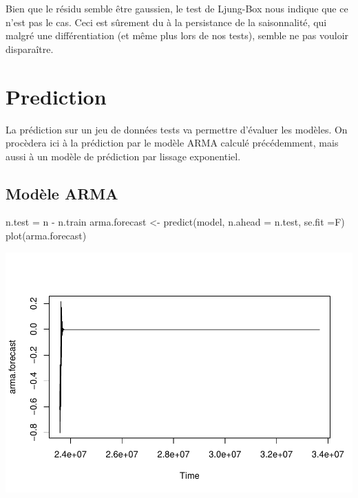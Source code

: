 \documentclass[
]{article}
\newenvironment{Shaded}{\begin{snugshade}}{\end{snugshade}}
\newcommand{\AttributeTok}[1]{\textcolor[rgb]{0.77,0.63,0.00}{#1}}
\newcommand{\FunctionTok}[1]{\textcolor[rgb]{0.00,0.00,0.00}{#1}}
\newcommand{\NormalTok}[1]{#1}
\newcommand{\OtherTok}[1]{\textcolor[rgb]{0.56,0.35,0.01}{#1}}
\newcommand{\SpecialCharTok}[1]{\textcolor[rgb]{0.00,0.00,0.00}{#1}}
\begin{document}
Bien que le résidu semble être gaussien, le test de Ljung-Box nous
indique que ce n'est pas le cas. Ceci est sûrement du à la persistance
de la saisonnalité, qui malgré une différentiation (et même plus lors de
nos tests), semble ne pas vouloir disparaître.

\hypertarget{prediction}{%
\section{Prediction}\label{prediction}}

La prédiction sur un jeu de données tests va permettre d'évaluer les
modèles. On procèdera ici à la prédiction par le modèle ARMA calculé
précédemment, mais aussi à un modèle de prédiction par lissage
exponentiel.

\hypertarget{moduxe8le-arma}{%
\subsection{Modèle ARMA}\label{moduxe8le-arma}}

\begin{Shaded}
\begin{Highlighting}[]
\NormalTok{n.test }\OtherTok{=}\NormalTok{ n }\SpecialCharTok{{-}}\NormalTok{ n.train}
\NormalTok{arma.forecast }\OtherTok{\textless{}{-}} \FunctionTok{predict}\NormalTok{(model, }\AttributeTok{n.ahead =}\NormalTok{ n.test, }\AttributeTok{se.fit =}\NormalTok{F)}
\FunctionTok{plot}\NormalTok{(arma.forecast)}
\end{Highlighting}
\end{Shaded}

\includegraphics{STA202_report_files/figure-latex/ARMA.predict-1.pdf}
\end{document}
